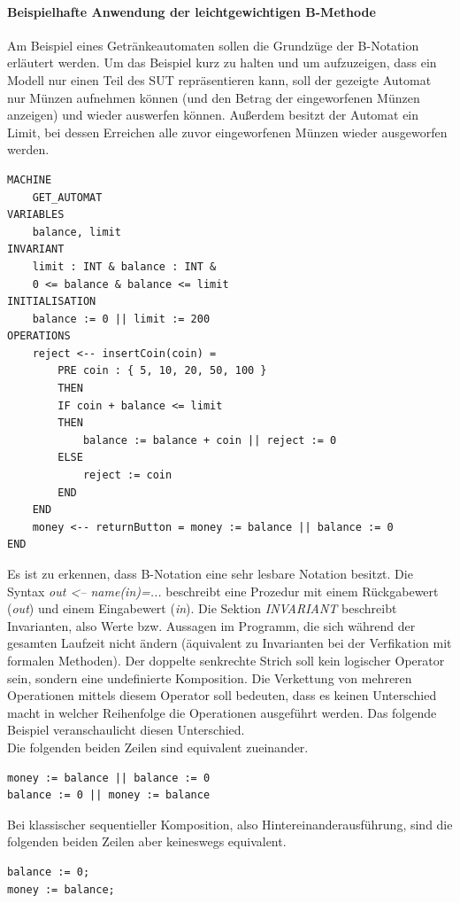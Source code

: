 \paragraph{Beispielhafte Anwendung der leichtgewichtigen B-Methode}
Am Beispiel eines Getränkeautomaten sollen die Grundzüge der B-Notation erläutert werden. Um das Beispiel kurz zu halten und um aufzuzeigen, dass ein Modell nur einen Teil des \Gls{SUT} repräsentieren kann, soll der gezeigte Automat nur Münzen aufnehmen können (und den Betrag der eingeworfenen Münzen anzeigen) und wieder auswerfen können. Außerdem besitzt der Automat ein Limit, bei dessen Erreichen alle zuvor eingeworfenen Münzen wieder ausgeworfen werden.

\begin{lstlisting}[caption={Modell eines Getränkeautomaten in B-Notation},label=lst:b-notation]
MACHINE
	GET_AUTOMAT
VARIABLES
	balance, limit
INVARIANT
	limit : INT & balance : INT &
	0 <= balance & balance <= limit
INITIALISATION
	balance := 0 || limit := 200
OPERATIONS
	reject <-- insertCoin(coin) =
		PRE coin : { 5, 10, 20, 50, 100 }
		THEN
		IF coin + balance <= limit
		THEN
			balance := balance + coin || reject := 0
		ELSE
			reject := coin
		END
	END
	money <-- returnButton = money := balance || balance := 0
END
\end{lstlisting}

Es ist zu erkennen, dass B-Notation eine sehr lesbare Notation besitzt. Die Syntax \textit{out <-- name(in)=...} beschreibt eine Prozedur mit einem Rückgabewert (\textit{out}) und einem Eingabewert (\textit{in}). Die Sektion \textit{INVARIANT} beschreibt Invarianten, also Werte bzw. Aussagen im Programm, die sich während der gesamten Laufzeit nicht ändern (äquivalent zu Invarianten bei der Verfikation mit formalen Methoden). Der doppelte senkrechte Strich soll kein logischer Operator sein, sondern eine undefinierte Komposition. Die Verkettung von mehreren Operationen mittels diesem Operator soll bedeuten, dass es keinen Unterschied macht in welcher Reihenfolge die Operationen ausgeführt werden. Das folgende Beispiel veranschaulicht diesen Unterschied.\\

Die folgenden beiden Zeilen sind equivalent zueinander.
\begin{verbatim}
money := balance || balance := 0
balance := 0 || money := balance
\end{verbatim}

Bei klassischer sequentieller Komposition, also Hintereinanderausführung, sind die folgenden beiden Zeilen aber keineswegs equivalent.
\begin{verbatim}
balance := 0;
money := balance;
\end{verbatim}

